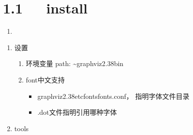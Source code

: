 \documentclass[letterpaper,12pt,english]{sphinxmanual}
\begin{document}
\section{1.1   install}
\label{\detokenize{001software/001install/Graphviz:install}}\begin{enumerate}
%
\item {} 

\end{enumerate}
\begin{enumerate}
%
\setcounter{enumi}{1}
\item {} 
设置
\begin{enumerate}
%
\item {} 
环境变量
path: \textasciitilde{}graphviz\sphinxhyphen{}2.38bin

\item {} 
font中文支持
\begin{itemize}
\item {} 
graphviz\sphinxhyphen{}2.38etcfontsfonts.conf， 指明字体文件目录

\end{itemize}
\begin{quote}

\begin{sphinxVerbatim}[commandchars=\\\{\}]
\PYGZbs{}\PYGZbs{}
\end{sphinxVerbatim}
\end{quote}
\begin{itemize}
\item {} 
.dot文件指明引用哪种字体

\end{itemize}
\begin{quote}

\begin{sphinxVerbatim}[commandchars=\\\{\}]
 \PYG{p}{[}\PYG{p}{]}
 \PYG{p}{[}\PYG{p}{]}
\end{sphinxVerbatim}
\end{quote}

\end{enumerate}

\item {} 
tools

\end{enumerate}
\end{document}
